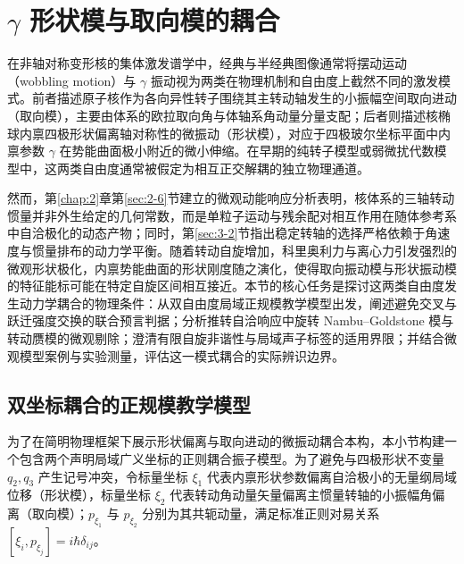 \section{$\gamma$ 形状模与取向模的耦合}\label{sec:3-6}

在非轴对称变形核的集体激发谱学中，经典与半经典图像通常将摆动运动（wobbling motion）与 $\gamma$ 振动视为两类在物理机制和自由度上截然不同的激发模式。前者描述原子核作为各向异性转子围绕其主转动轴发生的小振幅空间取向进动（取向模），主要由体系的欧拉取向角与体轴系角动量分量支配；后者则描述核椭球内禀四极形状偏离轴对称性的微振动（形状模），对应于四极玻尔坐标平面中内禀参数 $\gamma$ 在势能曲面极小附近的微小伸缩。在早期的纯转子模型或弱微扰代数模型中，这两类自由度通常被假定为相互正交解耦的独立物理通道。

然而，第\ref{chap:2}章第\ref{sec:2-6}节建立的微观动能响应分析表明，核体系的三轴转动惯量并非外生给定的几何常数，而是单粒子运动与残余配对相互作用在随体参考系中自洽极化的动态产物；同时，第\ref{sec:3-2}节指出稳定转轴的选择严格依赖于角速度与惯量排布的动力学平衡。随着转动自旋增加，科里奥利力与离心力引发强烈的微观形状极化，内禀势能曲面的形状刚度随之演化，使得取向振动模与形状振动模的特征能标可能在特定自旋区间相互接近。本节的核心任务是探讨这两类自由度发生动力学耦合的物理条件：从双自由度局域正规模教学模型出发，阐述避免交叉与跃迁强度交换的联合预言判据；分析推转自洽响应中旋转 Nambu--Goldstone 模与转动赝模的微观剔除；澄清有限自旋非谐性与局域声子标签的适用界限；并结合微观模型案例与实验测量，评估这一模式耦合的实际辨识边界。\cite{prochniak-rohozinski-2009-bohr-collective-hamiltonian,matsuzaki-2004-nuclear-inertia-and-wobbling,kvasil-2006-dy156-yb162-crpa-wobbling,doctoral-r1-g37-oi-2001-wobbling-gamma-coupling,doctoral-r1-g37-bhat-2025-microscopic-wobbling-even-even}

\subsection{双坐标耦合的正规模教学模型}\label{sec:3-6-1}

为了在简明物理框架下展示形状偏离与取向进动的微振动耦合本构，本小节构建一个包含两个声明局域广义坐标的正则耦合振子模型。为了避免与四极形状不变量 $q_2, q_3$ 产生记号冲突，令标量坐标 $\xi_1$ 代表内禀形状参数偏离自洽极小的无量纲局域位移（形状模），标量坐标 $\xi_2$ 代表转动角动量矢量偏离主惯量转轴的小振幅角偏离（取向模）；$p_{\xi_1}$ 与 $p_{\xi_2}$ 分别为其共轭动量，满足标准正则对易关系 $[\xi_i, p_{\xi_j}] = i\hbar\delta_{ij}$。

